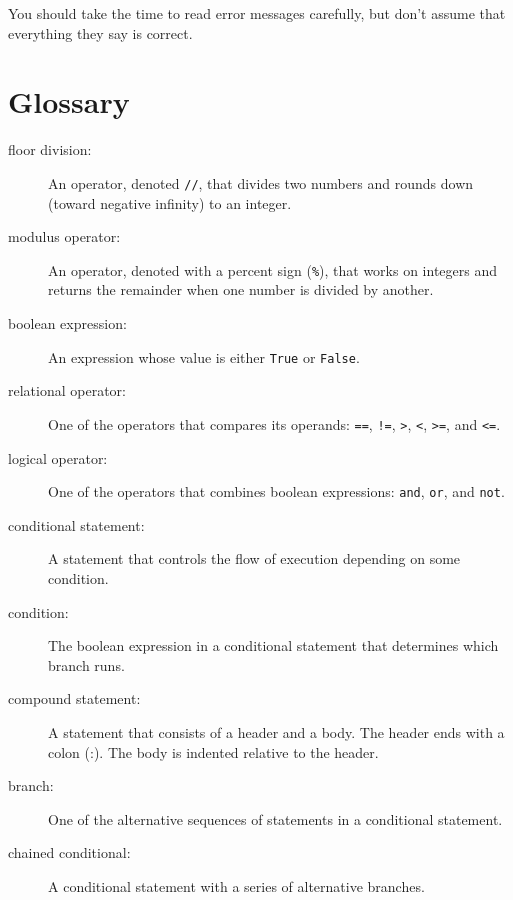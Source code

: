 You should take the time to read error messages carefully, but don't
assume that everything they say is correct.


\section{Glossary}

\begin{description}

\item[floor division:] An operator, denoted {\tt //}, that divides two
  numbers and rounds down (toward negative infinity) to an integer.

\item[modulus operator:]  An operator, denoted with a percent sign
({\tt \%}), that works on integers and returns the remainder when one
number is divided by another.

\item[boolean expression:]  An expression whose value is either 
{\tt True} or {\tt False}.

\item[relational operator:] One of the operators that compares
its operands: {\tt ==}, {\tt !=}, {\tt >}, {\tt <}, {\tt >=}, and {\tt <=}.

\item[logical operator:] One of the operators that combines boolean
expressions: {\tt and}, {\tt or}, and {\tt not}.

\item[conditional statement:]  A statement that controls the flow of
execution depending on some condition.

\item[condition:] The boolean expression in a conditional statement
that determines which branch runs.

\item[compound statement:]  A statement that consists of a header
and a body.  The header ends with a colon (:).  The body is indented
relative to the header.

\item[branch:] One of the alternative sequences of statements in
a conditional statement.

\item[chained conditional:]  A conditional statement with a series
of alternative branches.


\end{description}
